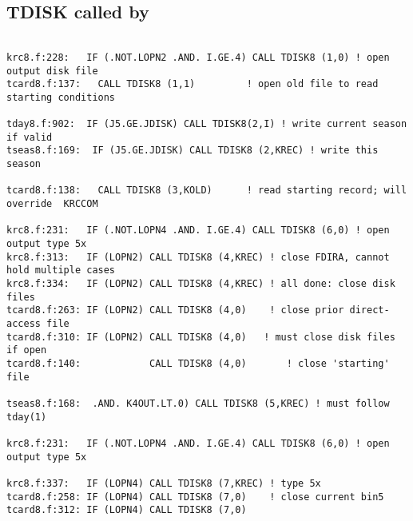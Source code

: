 \documentclass{article}
\begin{document}
\subsection {TDISK called by}
\begin{verbatim}

krc8.f:228:   IF (.NOT.LOPN2 .AND. I.GE.4) CALL TDISK8 (1,0) ! open output disk file   
tcard8.f:137:   CALL TDISK8 (1,1)         ! open old file to read starting conditions

tday8.f:902:  IF (J5.GE.JDISK) CALL TDISK8(2,I) ! write current season if valid
tseas8.f:169:  IF (J5.GE.JDISK) CALL TDISK8 (2,KREC) ! write this season

tcard8.f:138:   CALL TDISK8 (3,KOLD)      ! read starting record; will override  KRCCOM

krc8.f:231:   IF (.NOT.LOPN4 .AND. I.GE.4) CALL TDISK8 (6,0) ! open output type 5x
krc8.f:313:   IF (LOPN2) CALL TDISK8 (4,KREC) ! close FDIRA, cannot hold multiple cases
krc8.f:334:   IF (LOPN2) CALL TDISK8 (4,KREC) ! all done: close disk files
tcard8.f:263: IF (LOPN2) CALL TDISK8 (4,0)    ! close prior direct-access file
tcard8.f:310: IF (LOPN2) CALL TDISK8 (4,0)   ! must close disk files if open
tcard8.f:140:            CALL TDISK8 (4,0)       ! close 'starting' file

tseas8.f:168:  .AND. K4OUT.LT.0) CALL TDISK8 (5,KREC) ! must follow tday(1)
 
krc8.f:231:   IF (.NOT.LOPN4 .AND. I.GE.4) CALL TDISK8 (6,0) ! open output type 5x

krc8.f:337:   IF (LOPN4) CALL TDISK8 (7,KREC) ! type 5x
tcard8.f:258: IF (LOPN4) CALL TDISK8 (7,0)    ! close current bin5
tcard8.f:312: IF (LOPN4) CALL TDISK8 (7,0)    

\end{verbatim} 
\end{document}
